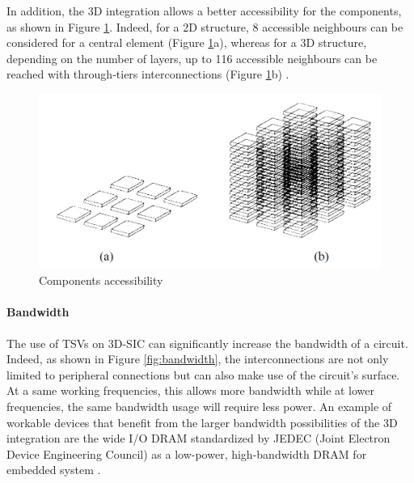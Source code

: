 In addition, the 3D integration allows a better accessibility for the components, as shown in Figure \ref{fig:accessibility}. Indeed, for a 2D structure, 8 accessible neighbours can be considered for a central element (Figure \ref{fig:accessibility}a), whereas for a 3D structure, depending on the number of layers, up to 116 accessible neighbours can be reached with through-tiers interconnections (Figure \ref{fig:accessibility}b) \cite{659500}.

\begin{figure}[h!]
\begin{center}
\includegraphics[width=0.8\linewidth]{accessibility.png}
\end{center}
\vspace{-0.5cm}
\caption{Components accessibility \cite{659500}}
\label{fig:accessibility}
\end{figure}

\paragraph{Bandwidth}

The use of TSVs on 3D-SIC can significantly increase the bandwidth of a circuit. Indeed, as shown in Figure \ref{fig:bandwidth}, the interconnections are not only limited to peripheral connections but can also make use of the circuit's surface. At a same working frequencies, this allows more bandwidth while at lower frequencies, the same bandwidth usage will require less power. An example of workable devices that benefit from the larger bandwidth possibilities of the 3D integration are the wide I/O DRAM standardized by JEDEC (Joint Electron Device Engineering Council) as a low-power, high-bandwidth DRAM for embedded system \cite{5746413,jedec2011,Zhang:2014:HWI:2591513.2591529}.

